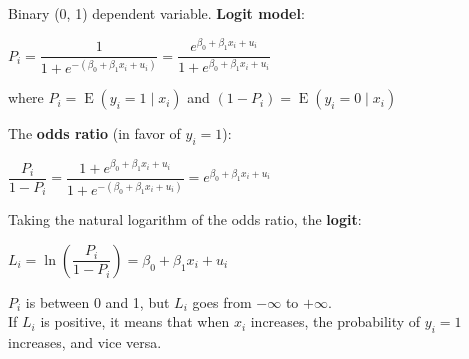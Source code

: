 \documentclass[10pt, a4paper, landscape]{article}
\DeclareMathOperator{\E}{E}
\begin{document}
\begin{multicols}{3}
Binary (0, 1) dependent variable. \textbf{Logit model}:

\begin{center}
	\( P_{i} = \dfrac{1}{1 + e^{-(\beta_{0} + \beta_{1} x_{i} + u_{i})}}= \dfrac{e^{\beta_{0} + \beta_{1} x_{i} + u_{i}}}{1 + e^{\beta_{0} + \beta_{1} x_{i} + u_{i}}} \)
\end{center}

where \( P_{i} = \E(y_{i} = 1 \mid x_{i}) \) and \( (1 - P_{i}) = \E(y_{i} = 0 \mid x_{i}) \)

The \textbf{odds ratio} (in favor of \( y_{i} = 1 \)):

\begin{center}
	\( \dfrac{P_{i}}{1 - P_{i}} = \dfrac{1 + e^{\beta_{0} + \beta_{1} x_{i} + u_{i}}}{1 + e^{-(\beta_{0} + \beta_{1} x_{i} + u_{i})}} = e^{\beta_{0} + \beta_{1} x_{i} + u_{i}} \)
\end{center}

Taking the natural logarithm of the odds ratio, the \textbf{logit}:

\begin{center}
	\( L_{i} = \ln \left( \dfrac{P_i}{1 - P_i}\right) = \beta_{0} + \beta_{1} x_{i} + u_{i} \)
\end{center}

\setlength{\multicolsep}{6pt}
\begin{multicols}{2}

\( P_{i} \) is between 0 and 1, but \( L_{i} \) goes from \( -\infty \) to \( +\infty \). \\

If \( L_{i} \) is positive, it means that when \( x_{i} \) increases, the probability of \( y_{i} = 1 \) increases, and vice versa.

\columnbreak


\end{multicols}


\end{multicols}
\end{document}
